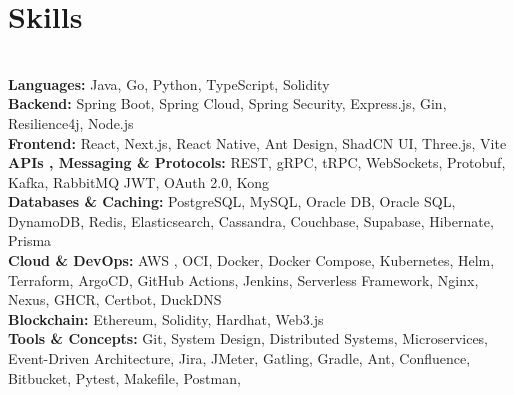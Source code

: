 \section*{Skills}
\BigDivider\\
\small
\noindent\textbf{Languages:} Java, Go, Python, TypeScript, Solidity\\[0.2em]
\textbf{Backend:} Spring Boot, Spring Cloud, Spring Security, Express.js, Gin, Resilience4j, Node.js\\[0.2em]
\textbf{Frontend:} React, Next.js, React Native, Ant Design, ShadCN UI, Three.js, Vite\\[0.2em]
\textbf{APIs , Messaging \& Protocols:} REST, gRPC, tRPC, WebSockets, Protobuf, Kafka, RabbitMQ JWT, OAuth 2.0, Kong\\[0.2em]
\textbf{Databases \& Caching:} PostgreSQL, MySQL, Oracle DB, Oracle SQL, DynamoDB, Redis, Elasticsearch, Cassandra, Couchbase, Supabase,  Hibernate, Prisma\\[0.2em]
\textbf{Cloud \& DevOps:} AWS , OCI, Docker, Docker Compose, Kubernetes, Helm, Terraform, ArgoCD, GitHub Actions, Jenkins, Serverless Framework, Nginx, Nexus, GHCR, Certbot, DuckDNS\\[0.2em]
\textbf{Blockchain:} Ethereum, Solidity, Hardhat, Web3.js\\[0.2em]
\textbf{Tools \& Concepts:} Git, System Design, Distributed Systems, Microservices, Event-Driven Architecture, Jira, JMeter, Gatling, Gradle, Ant, Confluence, Bitbucket, Pytest, Makefile, Postman, 
\normalsize
